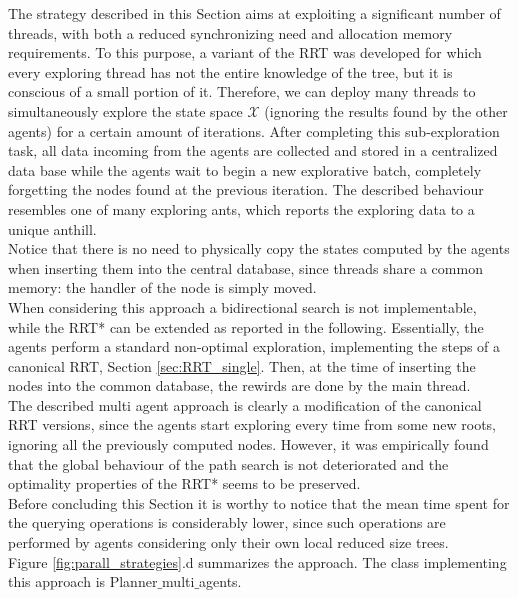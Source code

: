 The strategy described in this Section aims at exploiting a significant number of threads, with both a reduced synchronizing need and allocation memory requirements. To this purpose, a variant of the RRT was developed for which every exploring thread has not the entire knowledge of the
tree, but it is conscious of a small portion of it. 
Therefore, we can deploy many threads to simultaneously explore the state space $\mathcal{X}$ (ignoring the results found by the other agents) for
a certain amount of iterations. After completing this sub-exploration task, all data incoming from the agents are collected and stored in a centralized data base while the agents wait to begin a new explorative batch, completely forgetting the nodes found at the previous iteration. 
The described behaviour resembles one of many exploring ants, which reports the exploring data to a unique anthill.
\\
Notice that there is no need to physically copy the states computed by the agents when inserting them into the central database, since threads share a common memory: the handler of the node is simply moved. 
\\
When considering this approach a bidirectional search is not implementable, while the RRT* can be extended as reported in the following.
Essentially, the agents perform a standard non-optimal exploration, implementing the steps of a canonical RRT, Section \ref{sec:RRT_single}.
Then, at the time of inserting the nodes into the common database, the rewirds are done by the main thread.
\\
The described multi agent approach is clearly a modification of the canonical RRT versions, since the agents start exploring every time from some new roots, ignoring all the previously computed nodes. However, it was empirically found that the global behaviour of the path search is not deteriorated and the optimality properties of the RRT* seems to be preserved.
\\
Before concluding this Section it is worthy to notice that the mean time spent for the querying operations is considerably
lower, since such operations are performed by agents considering only their own local reduced size trees.
\\
Figure \ref{fig:parall_strategies}.d summarizes the approach.
The class implementing this approach is Planner$\_$multi$\_$agents.
